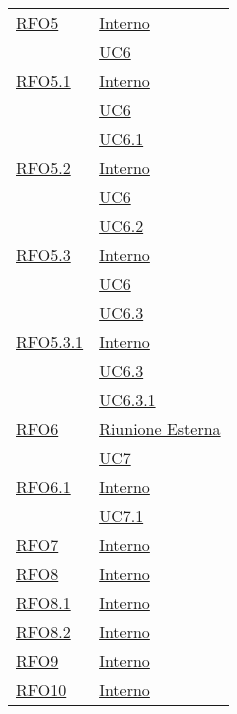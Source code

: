 \begin{longtable}{|>{\centering}m{5cm}|m{5cm}<{\centering}|}
\hyperlink{RFO5}{RFO5} &  \hyperlink{Interno}{Interno}\\  &\hyperref[UC6]{UC6}\\ \hline

\hyperlink{RFO5.1}{RFO5.1} &\hyperlink{Interno}{Interno}\\  &\hyperref[UC6]{UC6}\\  &\hyperref[UC6.1]{UC6.1}\\ \hline

\hyperlink{RFO5.2}{RFO5.2} &  \hyperlink{Interno}{Interno}\\  &\hyperref[UC6]{UC6}\\  &\hyperref[UC6.2]{UC6.2}\\ \hline

\hyperlink{RFO5.3}{RFO5.3} &  \hyperlink{Interno}{Interno}\\  &\hyperref[UC6]{UC6}\\  &\hyperref[UC6.3]{UC6.3}\\ \hline

\hyperlink{RFO5.3.1}{RFO5.3.1} &  \hyperlink{Interno}{Interno}\\  &\hyperref[UC6.3]{UC6.3}\\  &\hyperref[UC6.3.1]{UC6.3.1}\\ \hline

\hyperlink{RFO6}{RFO6} &  \hyperlink{Riunione Esterna}{Riunione Esterna}\\  &\hyperref[UC7]{UC7}\\ \hline

\hyperlink{RFO6.1}{RFO6.1} & \hyperlink{Interno}{Interno}\\  &\hyperref[UC7.1]{UC7.1}\\ \hline

\hyperlink{RFO7}{RFO7} &  \hyperlink{Interno}{Interno}\\ \hline

\hyperlink{RFO8}{RFO8} &  \hyperlink{Interno}{Interno}\\ \hline

\hyperlink{RFO8.1}{RFO8.1} &  \hyperlink{Interno}{Interno}\\ \hline

\hyperlink{RFO8.2}{RFO8.2} & \hyperlink{Interno}{Interno}\\ \hline

\hyperlink{RFO9}{RFO9} & \hyperlink{Interno}{Interno}\\ \hline
	
\hyperlink{RFO10}{RFO10} &  \hyperlink{Interno}{Interno}\\ \hline


\end{longtable}
